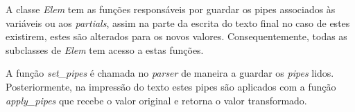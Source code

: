 \documentclass[../relatorio.tex]{subfiles}
\begin{document}
    A classe \textit{Elem} tem as funções responsáveis por guardar os pipes associados às variáveis
    ou aos \textit{partials}, assim na parte da escrita do texto final no caso de estes existirem,
    estes são alterados para os novos valores. Consequentemente, todas as subclasses de \textit{Elem} tem
    acesso a estas funções.

    A função \textit{set\_pipes} é chamada no \textit{parser} de maneira a guardar os \textit{pipes} lidos. 
    Posteriormente, na impressão do texto estes pipes são aplicados com a função \textit{apply\_pipes} 
    que recebe o valor original e
    retorna o valor transformado.
\end{document}
